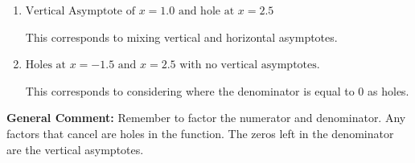 \documentclass{extbook}[14pt]
\begin{document}
\begin{enumerate}
{\begin{enumerate}[label=\Alph*.]
This is the correct answer.
\item \( \text{Vertical Asymptote of } x = 1.0 \text{ and hole at } x = 2.5 \)

This corresponds to mixing vertical and horizontal asymptotes.
\item \( \text{Holes at } x = -1.5 \text{ and } x = 2.5 \text{ with no vertical asymptotes.} \)

This corresponds to considering where the denominator is equal to 0 as holes.
\end{enumerate}

\textbf{General Comment:} Remember to factor the numerator and denominator. Any factors that cancel are holes in the function. The zeros left in the denominator are the vertical asymptotes.
}
\end{enumerate}
\end{document}
